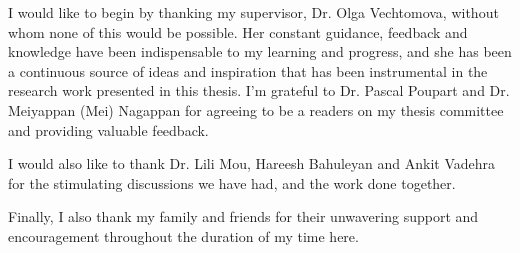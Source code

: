 I would like to begin by thanking my supervisor, Dr. Olga Vechtomova, without whom none of this would be possible. Her constant guidance, feedback and knowledge have been indispensable to my learning and progress, and she has been a continuous source of ideas and inspiration that has been instrumental in the research work presented in this thesis. I'm grateful to Dr. Pascal Poupart and Dr. Meiyappan (Mei) Nagappan for agreeing to be a readers on my thesis committee and providing valuable feedback.

I would also like to thank Dr. Lili Mou, Hareesh Bahuleyan and Ankit Vadehra for the stimulating discussions we have had, and the work done together.

Finally, I also thank my family and friends for their unwavering support and encouragement throughout the duration of my time here.
